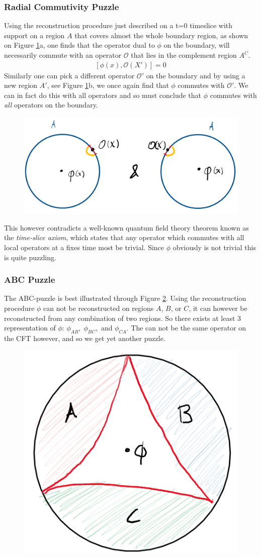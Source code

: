 \documentclass[letter,12pt]{article}
\newcommand{\BO}{\mathcal{O}}
\newcommand{\OO}{\mathcal{O}}
\begin{document}
\subsubsection*{Radial Commutivity Puzzle}
Using the reconstruction procedure just described on a t=0 timeslice with support on a region $A$ that covers almost the whole boundary region, as shown on Figure \ref{fig:adscftfig3}a, one finds that the operator dual to $\phi$ on the boundary, will necessarily commute with an operator $\OO$ that lies in the complement region $A^C$. 
\begin{equation}
	\begin{aligned}
		\left[\phi(x),\BO(X')\right]=0
	\end{aligned}
\end{equation}
Similarly one can pick a different operator $\OO '$ on the boundary and by using a new region $A'$, see Figure \ref{fig:adscftfig3}b, we once again find that $\phi$ commutes with $\OO '$. We can in fact do this with all operators and so must conclude that $\phi$ commutes with \textit{all} operators on the boundary.
\begin{figure}[]
	\centering
	\includegraphics[width=0.75\linewidth]{ADS_CFT_Fig3}
	\caption{}
	\label{fig:adscftfig3}
\end{figure}
This however contradicts a well-known quantum field theory theorem known as the \textit{time-slice axiom}, which states that any operator which commutes with all local operators at a fixes time most be trivial. Since $\phi$ obviously is not trivial this is quite puzzling.

\subsubsection*{ABC Puzzle}
The ABC-puzzle is best illustrated through Figure \ref{fig:adscftfig4}. Using the reconstruction procedure $\phi$ can not be reconstructed on regions $A$, $B$, or $C$, it can however be reconstructed from any combination of two regions. So there exists at least 3 representation of $\phi$: $\phi_{AB},\; \phi_{BC},$ and $\phi_{CA}$. The can not be the same operator on the CFT however, and so we get yet another puzzle. 
\begin{figure}[]
	\centering
	\includegraphics[width=0.25\linewidth]{ADS_CFT_Fig4}
	\caption{}
	\label{fig:adscftfig4}
\end{figure}
\end{document}
